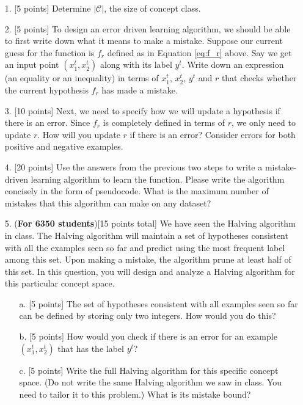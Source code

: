 \begin{enumerate}


\item[1.] [5 points] Determine $|\mathcal{C}|$, the size of concept
  class.
  
\item[2.] [5 points] To design an error driven learning algorithm, we
  should be able to first write down what it means to make a mistake.
  Suppose our current guess for the function is $f_r$ defined as in
  Equation \ref{eq:f_r} above. Say we get an input point $(x_1^t,
  x_2^t)$ along with its label $y^t$. Write down an expression (an
  equality or an inequality) in terms of $x_1^t$, $x_2^t$, $y^t$ and
  $r$ that checks whether the current hypothesis $f_r$ has made a
  mistake.

\item[3.] [10 points] Next, we need to specify how we will update a
  hypothesis if there is an error. Since $f_r$ is completely defined
  in terms of $r$, we only need to update $r$. How will you update $r$
  if there is an error? Consider errors for both positive and negative
  examples.

\item[4.] [20 points] Use the answers from the previous two steps to
  write a mistake-driven learning algorithm to learn the function.
  Please write the algorithm concisely in the form of pseudocode. What
  is the maximum number of mistakes that this algorithm can make on
  any dataset?

\item[5.] ({\bf For 6350 students})[15 points total] We have seen the
  Halving algorithm in class. The Halving algorithm will maintain a
  set of hypotheses consistent with all the examples seen so far and
  predict using the most frequent label among this set. Upon making a
  mistake, the algorithm prune at least half of this set. In this
  question, you will design and analyze a Halving algorithm for this
  particular concept space.

  \begin{enumerate}
  \item[a.] [5 points] The set of hypotheses consistent with all
    examples seen so far can be defined by storing only two integers.
    How would you do this?
  \item[b.] [5 points] How would you check if there is an error for an
    example $(x_1^t, x_2^t)$ that has the label $y^t$?
  \item[c.] [5 points] Write the full Halving algorithm for this
    specific concept space. (Do not write the same Halving algorithm
    we saw in class. You need to tailor it to this problem.) What is
    its mistake bound?
  \end{enumerate}

\end{enumerate}



